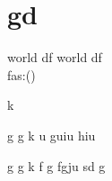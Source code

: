 \documentclass{article}
\author{Michele}
\begin{document}
\section{gd}
	world df \textbf{\gitRel}
	world df \textbf{\gitRel}\\
	fas:\gitRoff(\gitCommitterDate)\\
	\begin{changelog}[author=Michele]
		\begin{version}[version=1.20]
			\added
			\item k
		\end{version}
		
		\begin{version}[version=\gitReln]
			\added
			\item  g g k u guiu  hiu
		\end{version}
		
		\begin{version}[version=\gitReln]
			\added
			\item  g g k f g fgju sd g
		\end{version} 
	\end{changelog}

\begin{versionhistory}
\end{versionhistory}
\end{document}

